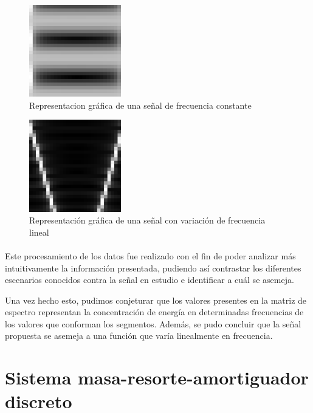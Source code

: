\documentclass{article}
\begin{document}
        \begin{figure}[h!]
            \centering
            \includegraphics[width=40mm]{constante}
            \caption{Representacion gráfica de una señal de frecuencia constante}
            \label{imagen2}
        \end{figure}

        \begin{figure}[h!]
            \centering
            \includegraphics[width=40mm]{variable}
            \caption{Representación gráfica de una señal con variación de frecuencia lineal}
            \label{imagen3}
        \end{figure}

        \paragraph{}
        Este procesamiento de los datos fue realizado con el fin de poder analizar más intuitivamente la información presentada, 
        pudiendo así contrastar los diferentes escenarios conocidos contra la señal en estudio e identificar a cuál se asemeja.
        
        Una vez hecho esto, pudimos conjeturar que los valores presentes en la matriz de espectro representan la concentración de 
        energía en determinadas frecuencias de los valores que conforman los segmentos. Además, se pudo concluir que la señal propuesta 
        se asemeja a una función que varía linealmente en frecuencia.



\section{Sistema masa-resorte-amortiguador discreto}
\end{document}
